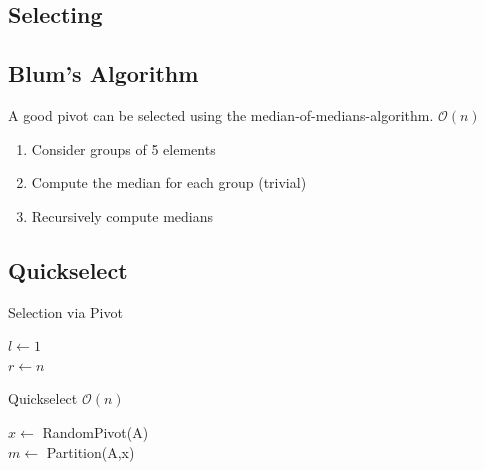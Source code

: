 \documentclass[9pt,landscape,a4paper, table]{extarticle}
\begin{document}
\begin{multicols*}{3}
\section{Selecting}

\subsection{Blum's Algorithm}
A good pivot can be selected using the median-of-medians-algorithm. $\mathcal{O}(n)$

\begin{enumerate}
    \item Consider groups of 5 elements
    \item Compute the median for each group (trivial)
    \item Recursively compute medians
\end{enumerate}

\subsection{Quickselect}
{\scriptsize
\begin{algorithm}[H]
    \caption{Selection via Pivot}
    
    \SetAlgoLined
    $l \leftarrow 1$\\
    $r \leftarrow n$
\end{algorithm}}

{\scriptsize
\begin{algorithm}[H]
    \caption{Quickselect $\mathcal{O}(n)$}
    
    \SetAlgoLined
    $x \leftarrow$ RandomPivot(A)\\
    $m \leftarrow$ Partition(A,x)\\
\end{algorithm}}


\end{multicols*}
\end{document}
